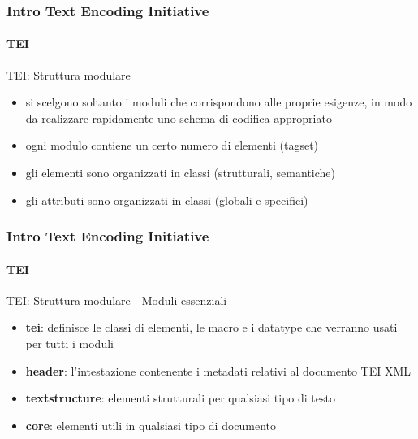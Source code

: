 

\begin{frame}
	\frametitle{Intro Text Encoding Initiative}
	\framesubtitle{TEI}
	\addtocounter{nframe}{1}

	\begin{block}{TEI: Struttura modulare}
		\begin{itemize}
			\item si scelgono soltanto i moduli che corrispondono alle proprie esigenze, in modo da realizzare rapidamente uno schema di codifica appropriato
			\item ogni modulo contiene un certo numero di elementi (tagset)
			\item gli elementi sono organizzati in classi (strutturali, semantiche)
			\item gli attributi sono organizzati in classi (globali e specifici)
		\end{itemize}

	\end{block}

\end{frame}




\begin{frame}
	\frametitle{Intro Text Encoding Initiative}
	\framesubtitle{TEI}
	\addtocounter{nframe}{1}

	\begin{block}{TEI: Struttura modulare - Moduli essenziali}
		\begin{itemize}
			\item \textbf{tei}: definisce le classi di elementi, le macro e i datatype che verranno usati per tutti i moduli
			\item \textbf{header}: l’intestazione contenente i metadati relativi al documento TEI XML
			\item \textbf{textstructure}: elementi strutturali per qualsiasi tipo di testo
			\item \textbf{core}: elementi utili in qualsiasi tipo di documento
		\end{itemize}

	\end{block}

\end{frame}

